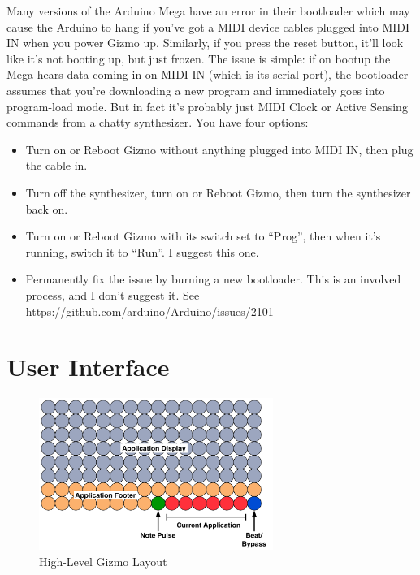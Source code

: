 \documentclass{article}
\begin{document}
Many versions of the Arduino Mega have an error in their bootloader which may cause the Arduino to hang if you've got a MIDI device cables plugged into MIDI IN when you power Gizmo up.  Similarly, if you press the reset button, it'll look like it's not booting up, but just frozen.  The issue is simple: if on bootup the Mega hears data coming in on MIDI IN (which is its serial port), the bootloader assumes that you're downloading a new program and immediately goes into program-load mode.    But in fact it's probably just MIDI Clock or Active Sensing commands from a chatty synthesizer.  You have four options:

\begin{itemize}
\item Turn on or Reboot Gizmo without anything plugged into MIDI IN, then plug the cable in.
\item Turn off the synthesizer, turn on or Reboot Gizmo, then turn the synthesizer back on.
\item Turn on or Reboot Gizmo with its switch set to ``Prog'', then when it's running, switch it to ``Run''.  I suggest this one.
\item Permanently fix the issue by burning a new bootloader.  This is an involved process, and I don't suggest it.  See https:/\!/github.com/arduino/Arduino/issues/2101
\end{itemize}


\clearpage

\section{User Interface}

\begin{figure}
\vspace{-1.5em}\includegraphics[width=3in]{OverallLayout.pdf}
\vspace{-2em}\caption{\small High-Level Gizmo Layout}
\label{HighLevelGizmoLayout}
\end{figure}
\end{document}
